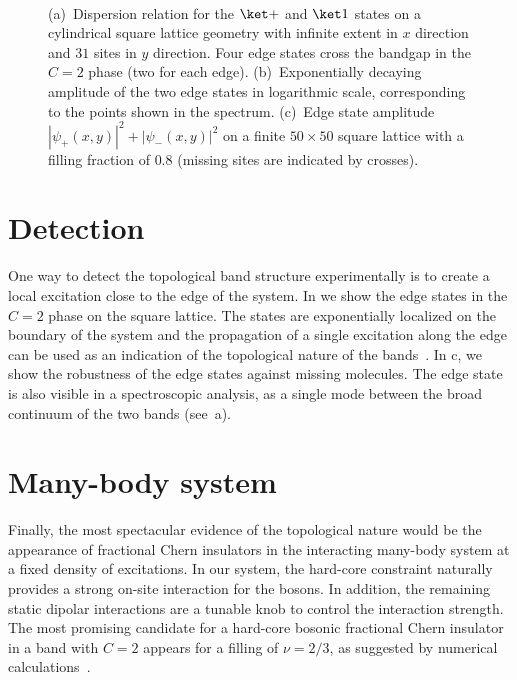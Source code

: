 \begin{figure}[ht]
    \centering
    \begin{minipage}[b]{.482\columnwidth}
         \\
        \vspace{2mm}
    \end{minipage}

    \caption{
        (a)~Dispersion relation for the $\ketp$ and $\keto$ states on a cylindrical square lattice geometry with infinite extent in $x$ direction and $31$ sites in $y$ direction.
        Four edge states cross the bandgap in the $C=2$ phase (two for each edge).
        (b)~Exponentially decaying amplitude of the two edge states in logarithmic scale, corresponding to the points shown in the spectrum.
        (c)~Edge state amplitude $|\psi_+(x,y)|^2 + |\psi_-(x,y)|^2$ on a finite $50 \times 50$ square lattice with a filling fraction of $0.8$ (missing sites are indicated by crosses).
    }
\end{figure}

\section{Detection}
One way to detect the topological band structure experimentally is to create a local excitation close to the edge of the system.
In  we show the edge states in the $C=2$ phase on the square lattice.
The states are exponentially localized on the boundary of the system and the propagation of a single excitation along the edge can be used as an indication of the topological nature of the bands~\cite{Hafezi2013}.
In c, we show the robustness of the edge states against missing molecules.
The edge state is also visible in a spectroscopic analysis, as a single mode between the broad continuum of the two bands (see~a).

\section{Many-body system}
Finally, the most spectacular evidence of the topological nature would be the appearance of fractional Chern insulators in the interacting many-body system at a fixed density of excitations.
In our system, the hard-core constraint naturally provides a strong on-site interaction for the bosons.
In addition, the remaining static dipolar interactions are a tunable knob to control the interaction strength.
The most promising candidate for a hard-core bosonic fractional Chern insulator in a band with $C=2$ appears for a filling of $\nu = 2/3$, as suggested by numerical calculations~\cite{Moller2009,Wang2012a}.


